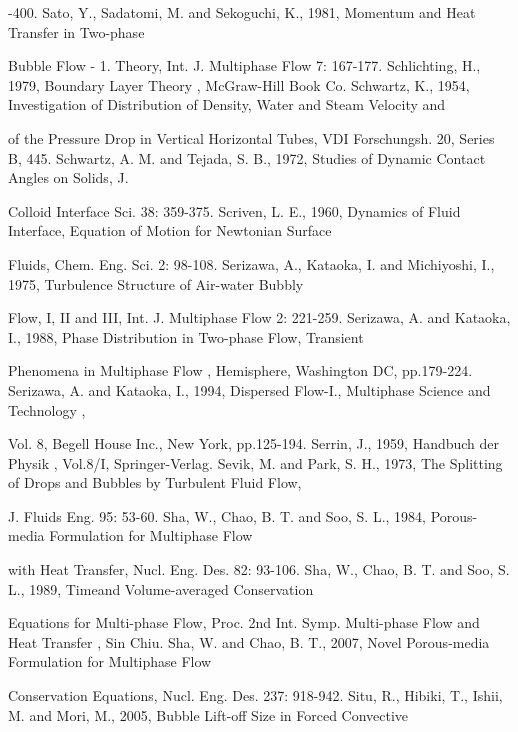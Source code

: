 \documentclass[11pt,a4paper,openany,fontset=none]{ctexbook}
\begin{document}
{\small\raggedright{}-400. Sato, Y., Sadatomi, M. and Sekoguchi, K., 1981, Momentum and Heat Transfer in Two-phase\par}
{\small\raggedright\noindent Bubble Flow - 1. Theory, Int. J. Multiphase Flow 7: 167-177. Schlichting, H., 1979, Boundary Layer Theory , McGraw-Hill Book Co. Schwartz, K., 1954, Investigation of Distribution of Density, Water and Steam Velocity and\par}
{\small\raggedright\noindent of the Pressure Drop in Vertical Horizontal Tubes, VDI Forschungsh. 20, Series B, 445. Schwartz, A. M. and Tejada, S. B., 1972, Studies of Dynamic Contact Angles on Solids, J.\par}
{\small\raggedright\noindent Colloid Interface Sci. 38: 359-375. Scriven, L. E., 1960, Dynamics of Fluid Interface, Equation of Motion for Newtonian Surface\par}
{\small\raggedright\noindent Fluids, Chem. Eng. Sci. 2: 98-108. Serizawa, A., Kataoka, I. and Michiyoshi, I., 1975, Turbulence Structure of Air-water Bubbly\par}
{\small\raggedright\noindent Flow, I, II and III, Int. J. Multiphase Flow 2: 221-259. Serizawa, A. and Kataoka, I., 1988, Phase Distribution in Two-phase Flow, Transient\par}
{\small\raggedright\noindent Phenomena in Multiphase Flow , Hemisphere, Washington DC, pp.179-224. Serizawa, A. and Kataoka, I., 1994, Dispersed Flow-I., Multiphase Science and Technology ,\par}
{\small\raggedright\noindent Vol. 8, Begell House Inc., New York, pp.125-194. Serrin, J., 1959, Handbuch der Physik , Vol.8/I, Springer-Verlag. Sevik, M. and Park, S. H., 1973, The Splitting of Drops and Bubbles by Turbulent Fluid Flow,\par}
{\small\raggedright\noindent J. Fluids Eng. 95: 53-60. Sha, W., Chao, B. T. and Soo, S. L., 1984, Porous-media Formulation for Multiphase Flow\par}
{\small\raggedright\noindent with Heat Transfer, Nucl. Eng. Des. 82: 93-106. Sha, W., Chao, B. T. and Soo, S. L., 1989, Timeand Volume-averaged Conservation\par}
{\small\raggedright\noindent Equations for Multi-phase Flow, Proc. 2nd Int. Symp. Multi-phase Flow and Heat Transfer , Sin Chiu. Sha, W. and Chao, B. T., 2007, Novel Porous-media Formulation for Multiphase Flow\par}
{\small\raggedright\noindent Conservation Equations, Nucl. Eng. Des. 237: 918-942. Situ, R., Hibiki, T., Ishii, M. and Mori, M., 2005, Bubble Lift-off Size in Forced Convective\par}
\end{document}
